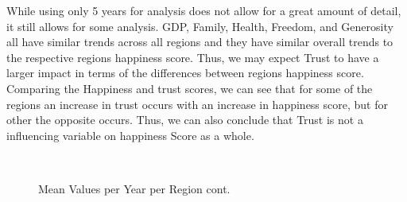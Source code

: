\documentclass{article}
\begin{document}
While using only 5 years for analysis does not allow for a great amount of detail, it still allows for some analysis. GDP, Family, Health, Freedom, and Generosity all have similar trends across all regions and they have similar overall trends to the respective regions happiness score. Thus, we may expect Trust to have a larger impact in terms of the differences between regions happiness score. Comparing the Happiness and trust scores, we can see that for some of the regions an increase in trust occurs with an increase in happiness score, but for other the opposite occurs. Thus, we can also conclude that Trust is not a influencing variable on happiness Score as a whole.

\begin{figure}[H]
    \centering
    \\
    \caption{Mean Values per Year per Region cont.}
    \label{fig:sereis2}
\end{figure}
\end{document}
